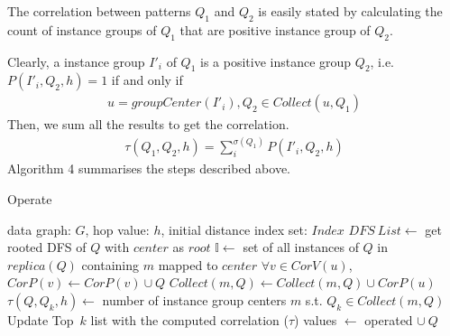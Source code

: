  The correlation between patterns $Q_1$ and $Q_2$ is easily stated by calculating the count of instance groups of $Q_1$ that are positive instance group of $Q_2$.
\par Clearly, a instance group $I'_i$ of $Q_1$ is a positive instance group $Q_2$, i.e. $P(I'_i,Q_2,h)=1$ if and only if
\begin{align}
u=groupCenter(I'_i), Q_2\in Collect(u,Q_1)
\end{align}
Then, we sum all the results to get the correlation.
\begin{align}
\tau(Q_1,Q_2,h)=\sum_i^{\sigma(Q_1)} P(I'_i,Q_2,h)
\end{align}
Algorithm 4 summarises the steps described above.
\begin{algorithm}[h!]
\caption{Operate}\label{algo:operate}
\begin{algorithmic}[1] 
\REQUIRE data graph: $G$, hop value: $h$, initial distance index set: $Index$
\ENSURE 
\STATE $DFS\ List\leftarrow$ get rooted {\sf DFS} of $Q$ with $center$ as $root$
\STATE $\mathbb{I}\leftarrow$ {set of all instances of $Q$ in $replica(Q)$ containing $m$ mapped to $center$}
\STATE $\forall v\in CorV(u)$, $CorP(v)\leftarrow CorP(v)\cup Q$
\STATE $Collect(m, Q)\leftarrow Collect(m, Q)\cup CorP(u)$
\ENDFOR
\ENDFOR
{}
\STATE $\tau(Q, Q_k, h)\leftarrow$ number of instance group centers $m$ s.t. $Q_k\in Collect(m, Q)$
\ENDFOR 
\STATE Update {\sf Top\ $k$} list with the computed correlation ($\tau$) values
 $\leftarrow$ {\sf operated} $\cup \ Q$
\end{algorithmic}
\end{algorithm}



